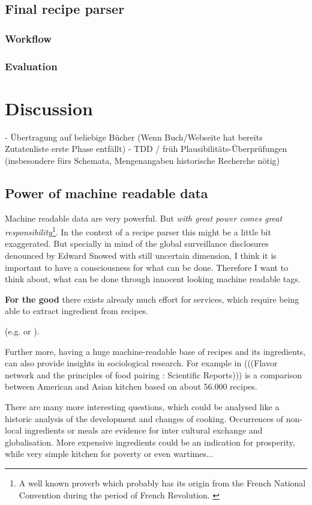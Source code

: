 \documentclass[12pt, twoside]{report}
\begin{document}
\section{Final recipe parser}
\subsection{Workflow}
\subsection{Evaluation}

\chapter{Discussion}
- Übertragung auf beliebige Bücher (Wenn Buch/Webseite hat bereits Zutatenliste erste Phase entfällt)
- TDD / früh Plausibilitäts-Überprüfungen (insbesondere fürs Schemata, Mengenangaben historische Recherche nötig)

\section{Power of machine readable data}
Machine readable data are very powerful. But \textit{with great power comes great responsibility}\footnote{A well known proverb which probably has its origin from the French National Convention during the period of French Revolution. \parencite{quoteInvestigator}}. In the context of a recipe parser this might be a little bit exaggerated. But specially in mind of the global surveillance disclosures denounced by Edward Snowed with still uncertain dimension, I think it is important to have a consciousness for what can be done. Therefore I want to think about, what can be done through innocent looking machine readable tags. 
\bigskip

\textbf{For the good} there exists already much effort for services, which require being able to extract ingredient from recipes.

 (e.g. \cite{ingredientNetworks} or \cite{recipeRecommendation}).

Further more, having a huge machine-readable base of recipes and its ingredients, can also provide insights in sociological research. For example in (((Flavor network and the principles of food pairing : Scientific Reports))) is a comparison between American and Asian kitchen based on about 56.000 recipes.

There are many more interesting questions, which could be analysed like a historic analysis of the development and changes of cooking. Occurrences of non-local ingredients or meals are evidence for inter cultural exchange and globalisation. More expensive ingredients could be an indication for prosperity, while very simple kitchen for poverty or even wartimes...
\bigskip
\end{document}

